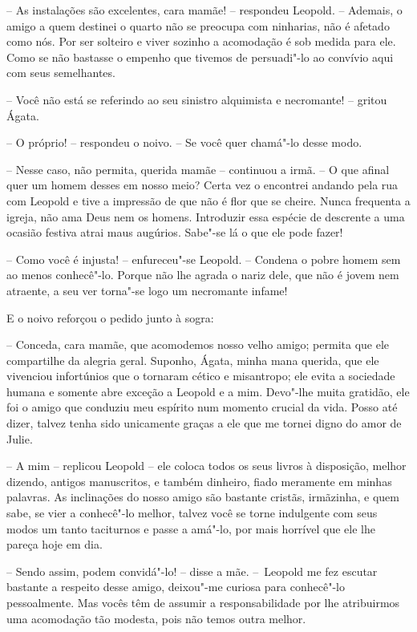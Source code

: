 -- As instalações são excelentes, cara mamãe! -- respondeu Leopold.
-- Ademais, o amigo a quem destinei o quarto não se preocupa com ninharias,
não é afetado como nós. Por ser solteiro e viver sozinho a acomodação é
sob medida para ele. Como se não bastasse o empenho que tivemos de
persuadi"-lo ao convívio aqui com seus semelhantes. 

 -- Você não está se referindo ao seu sinistro alquimista e
necromante! -- gritou Ágata.

-- O próprio! -- respondeu o noivo. -- Se você quer chamá"-lo desse modo.

-- Nesse caso, não permita, querida mamãe -- continuou a irmã. -- O que
afinal quer um homem desses em nosso meio? Certa vez o encontrei
andando pela rua com Leopold e tive a impressão de que não é flor que
se cheire. Nunca frequenta a igreja, não ama Deus nem os homens.
Introduzir essa espécie de descrente a uma ocasião festiva atrai maus
augúrios. Sabe"-se lá o que ele pode fazer!

-- Como você é injusta! -- enfureceu"-se Leopold. -- Condena o pobre
homem sem ao menos conhecê"-lo. Porque não lhe agrada o nariz dele, que
não é jovem nem atraente, a seu ver torna"-se logo um necromante infame!

E o noivo reforçou o pedido junto à sogra:

-- Conceda, cara mamãe, que acomodemos nosso velho amigo; permita
que ele compartilhe da alegria geral. Suponho, Ágata, minha mana
querida, que ele vivenciou infortúnios que o tornaram cético e
misantropo; ele evita a sociedade humana e somente abre exceção a
Leopold e a mim. Devo"-lhe muita gratidão, ele foi o amigo que conduziu
meu espírito num momento crucial da vida. Posso até dizer, talvez tenha
sido unicamente graças a ele que me tornei digno do amor de Julie. 

-- A mim -- replicou Leopold -- ele coloca todos os seus livros à
disposição, melhor dizendo, antigos manuscritos, e também dinheiro,
fiado meramente em minhas palavras. As inclinações do nosso amigo são
bastante cristãs, irmãzinha, e quem sabe, se vier a conhecê"-lo melhor,
talvez você se torne indulgente com seus modos um tanto taciturnos e
passe a amá"-lo, por mais horrível que ele lhe pareça hoje em dia.

 -- Sendo assim, podem convidá"-lo! -- disse a mãe. \mbox{-- Leopold} me fez
escutar bastante a respeito desse amigo, deixou"-me curiosa para
conhecê"-lo pessoalmente. Mas vocês têm de assumir a responsabilidade
por lhe atribuirmos uma acomodação tão modesta, pois não temos outra melhor.

